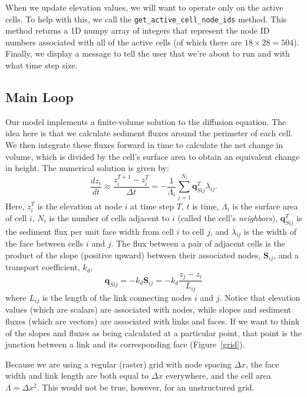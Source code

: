\documentclass[12pt]{article}
\newcommand{\code}[1]{{\tt #1}}
\begin{document}
When we update elevation values, we will want to operate only on the active cells. To help with this, we call the \code{get\_active\_cell\_node\_ids} method. This method returns a 1D numpy array of integers that represent the node ID numbers associated with all of the active cells (of which there are $18\times 28 = 504$). Finally, we display a message to tell the user that we're about to run and with what time step size.


\subsection{Main Loop}

Our model implements a finite-volume solution to the diffusion equation. The idea here is that we calculate sediment fluxes around the perimeter of each cell. We then integrate these fluxes forward in time to calculate the net change in volume, which is divided by the cell's surface area to obtain an equivalent change in height. The numerical solution is given by:
\begin{equation}
\frac{d z_i}{dt} \approx \frac{z^{T+1}_i-z^T_i}{\Delta t}
= - \frac{1}{\Lambda_i} \sum_{j=1}^{N_i} \mathbf{q}_{Sij}^T \lambda_{ij}.
\label{eq:dzdt}
\end{equation}
Here, $z_i^T$ is the elevation at node $i$ at time step $T$, $t$ is time, $\Lambda_i$ is the surface area of cell $i$, $N_i$ is the number of cells adjacent to $i$ (called the cell's {\em neighbors}), $\mathbf{q}_{Sij}^T$ is the sediment flux per unit face width from cell $i$ to cell $j$, and $\lambda_{ij}$ is the width of the face between cells $i$ and $j$. The flux between a pair of adjacent cells is the product of the slope (positive upward) between their associated nodes, $\mathbf{S}_{ij}$, and a transport coefficient, $k_d$,
\begin{equation}
\mathbf{q}_{Sij} = - k_d \mathbf{S}_{ij} = - k_d \frac{z_j-z_i}{L_{ij}}
\end{equation}
where $L_{ij}$ is the length of the link connecting nodes $i$ and $j$. Notice that elevation values (which are scalars) are associated with nodes, while slopes and sediment fluxes (which are vectors) are associated with links and faces. If we want to think of the slopes and fluxes as being calculated at a particular point, that point is the junction between a link and its corresponding face (Figure~\ref{grid}).

Because we are using a regular (raster) grid with node spacing $\Delta x$, the face width and link length are both equal to $\Delta x$ everywhere, and the cell area $\Lambda=\Delta x^2$. This would not be true, however, for an unstructured grid.
\end{document}
